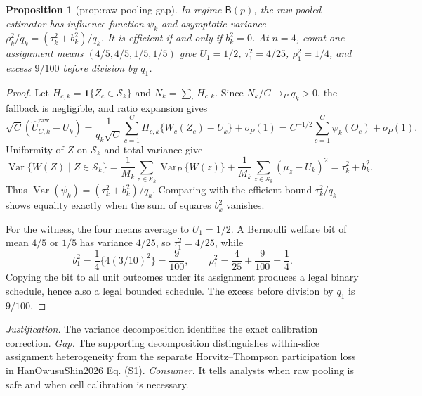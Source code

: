 \documentclass{article}
\newtheorem{proposition}{Proposition}
\begin{document}
\begin{proposition}[prop:raw-pooling-gap]\label{prop:raw-pooling-gap}
In regime \(\mathsf B(p)\), the raw pooled estimator has influence function \(\psi_k\) and asymptotic variance \(\rho_k^2/q_k=(\tau_k^2+b_k^2)/q_k\). It is efficient if and only if \(b_k^2=0\). At \(n=4\), count-one assignment means \((4/5,4/5,1/5,1/5)\) give \(U_1=1/2\), \(\tau_1^2=4/25\), \(\rho_1^2=1/4\), and excess \(9/100\) before division by \(q_1\).
\end{proposition}
\begin{proof}
Let \(H_{c,k}=\mathbf1\{Z_c\in\mathcal S_k\}\) and \(N_k=\sum_cH_{c,k}\).  Since \(N_k/C\to_Pq_k>0\), the fallback is negligible, and ratio expansion gives
\[
 \sqrt C(\widehat U^{\mathrm{raw}}_{C,k}-U_k)
 =\frac1{q_k\sqrt C}\sum_{c=1}^CH_{c,k}\{W_c(Z_c)-U_k\}+o_P(1)
 =C^{-1/2}\sum_{c=1}^C\psi_k(O_c)+o_P(1). \tag{24}
\]
Uniformity of \(Z\) on \(\mathcal S_k\) and total variance give
\[
 \operatorname{Var}\{W(Z)\mid Z\in\mathcal S_k\}
 =\frac1{M_k}\sum_{z\in\mathcal S_k}\operatorname{Var}_P\{W(z)\}
 +\frac1{M_k}\sum_{z\in\mathcal S_k}(\mu_z-U_k)^2
 =\tau_k^2+b_k^2. \tag{25}
\]
Thus \(\operatorname{Var}(\psi_k)=(\tau_k^2+b_k^2)/q_k\).  Comparing with the efficient bound \(\tau_k^2/q_k\) shows equality exactly when the sum of squares \(b_k^2\) vanishes.

For the witness, the four means average to \(U_1=1/2\).  A Bernoulli welfare bit of mean \(4/5\) or \(1/5\) has variance \(4/25\), so \(\tau_1^2=4/25\), while
\[
 b_1^2=\frac14\{4(3/10)^2\}=\frac9{100},\qquad
 \rho_1^2=\frac4{25}+\frac9{100}=\frac14. \tag{26}
\]
Copying the bit to all unit outcomes under its assignment produces a legal binary schedule, hence also a legal bounded schedule.  The excess before division by \(q_1\) is \(9/100\).
\end{proof}
\par\smallskip\noindent \textit{Justification.} The variance decomposition identifies the exact calibration correction. \textit{Gap.} The supporting decomposition distinguishes within-slice assignment heterogeneity from the separate Horvitz--Thompson participation loss in HanOwusuShin2026 Eq. (S1). \textit{Consumer.} It tells analysts when raw pooling is safe and when cell calibration is necessary.
\end{document}
